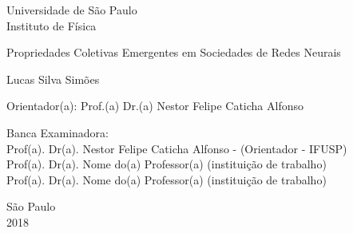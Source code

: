
\pagestyle{empty}
\begin{center}

	{\fontsize{16}{16} \selectfont Universidade de São Paulo \\}
	\vspace{0.1cm}
	{\fontsize{16}{16} \selectfont Instituto de Física}
    \vspace{3.3cm}

	{\fontsize{22}{22}\selectfont Propriedades Coletivas Emergentes em Sociedades de Redes Neurais \par}
    \vspace{2cm}


    {\fontsize{18}{18}\selectfont Lucas Silva Simões\par}

    \vspace{2cm}

\end{center}

\leftskip 6cm
\begin{flushright}
\leftskip 6cm
Orientador(a): Prof.(a) Dr.(a)  Nestor Felipe Caticha Alfonso
\end{flushright}

    \vspace{0.8cm}


\par
\leftskip 6cm
\par
\leftskip 0cm
\vskip 2cm


\noindent Banca Examinadora: \\
\noindent Prof(a). Dr(a). Nestor Felipe Caticha Alfonso - (Orientador - IFUSP) \\
Prof(a). Dr(a). Nome do(a) Professor(a) (instituição de trabalho) \\
Prof(a). Dr(a). Nome do(a) Professor(a) (instituição de trabalho) \\
\vspace{2.8cm}


\centering
    {São Paulo \\  2018}
\clearpage


